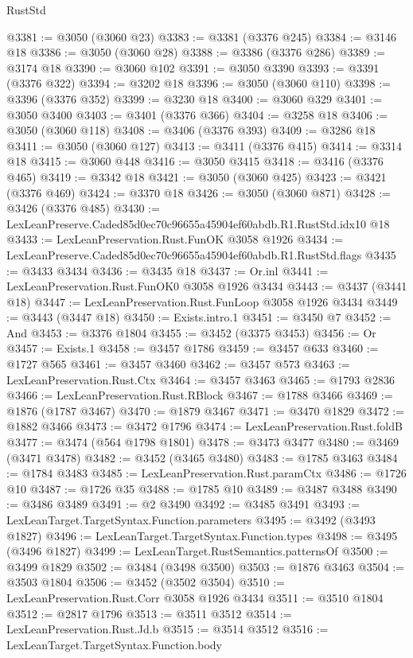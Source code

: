 \begin{lexlean}{RustStd}
\begin{coremodule}
@3381 := @3050 (@3060 @23)
@3383 := @3381 (@3376 @245)
@3384 := @3146 @18
@3386 := @3050 (@3060 @28)
@3388 := @3386 (@3376 @286)
@3389 := @3174 @18
@3390 := @3060 @102
@3391 := @3050 @3390
@3393 := @3391 (@3376 @322)
@3394 := @3202 @18
@3396 := @3050 (@3060 @110)
@3398 := @3396 (@3376 @352)
@3399 := @3230 @18
@3400 := @3060 @329
@3401 := @3050 @3400
@3403 := @3401 (@3376 @366)
@3404 := @3258 @18
@3406 := @3050 (@3060 @118)
@3408 := @3406 (@3376 @393)
@3409 := @3286 @18
@3411 := @3050 (@3060 @127)
@3413 := @3411 (@3376 @415)
@3414 := @3314 @18
@3415 := @3060 @448
@3416 := @3050 @3415
@3418 := @3416 (@3376 @465)
@3419 := @3342 @18
@3421 := @3050 (@3060 @425)
@3423 := @3421 (@3376 @469)
@3424 := @3370 @18
@3426 := @3050 (@3060 @871)
@3428 := @3426 (@3376 @485)
@3430 := LexLeanPreserve.Caded85d0ec70c96655a45904ef60abdb.R1.RustStd.idx10 @18
@3433 := LexLeanPreservation.Rust.FunOK @3058 @1926
@3434 := LexLeanPreserve.Caded85d0ec70c96655a45904ef60abdb.R1.RustStd.flags
@3435 := @3433 @3434
@3436 := @3435 @18
@3437 := Or.inl
@3441 := LexLeanPreservation.Rust.FunOK0 @3058 @1926 @3434
@3443 := @3437 (@3441 @18)
@3447 := LexLeanPreservation.Rust.FunLoop @3058 @1926 @3434
@3449 := @3443 (@3447 @18)
@3450 := Exists.intro.{1}
@3451 := @3450 @7
@3452 := And
@3453 := @3376 @1804
@3455 := @3452 (@3375 @3453)
@3456 := Or
@3457 := Exists.{1}
@3458 := @3457 @1786
@3459 := @3457 @633
@3460 := @1727 @565
@3461 := @3457 @3460
@3462 := @3457 @573
@3463 := LexLeanPreservation.Rust.Ctx
@3464 := @3457 @3463
@3465 := @1793 @2836
@3466 := LexLeanPreservation.Rust.RBlock
@3467 := @1788 @3466
@3469 := @1876 (@1787 @3467)
@3470 := @1879 @3467
@3471 := @3470 @1829
@3472 := @1882 @3466
@3473 := @3472 @1796
@3474 := LexLeanPreservation.Rust.foldB
@3477 := @3474 (@564 @1798 @1801)
@3478 := @3473 @3477
@3480 := @3469 (@3471 @3478)
@3482 := @3452 (@3465 @3480)
@3483 := @1785 @3463
@3484 := @1784 @3483
@3485 := LexLeanPreservation.Rust.paramCtx
@3486 := @1726 @10
@3487 := @1726 @35
@3488 := @1785 @10
@3489 := @3487 @3488
@3490 := @3486 @3489
@3491 := @2 @3490
@3492 := @3485 @3491
@3493 := LexLeanTarget.TargetSyntax.Function.parameters
@3495 := @3492 (@3493 @1827)
@3496 := LexLeanTarget.TargetSyntax.Function.types
@3498 := @3495 (@3496 @1827)
@3499 := LexLeanTarget.RustSemantics.patternsOf
@3500 := @3499 @1829
@3502 := @3484 (@3498 @3500)
@3503 := @1876 @3463
@3504 := @3503 @1804
@3506 := @3452 (@3502 @3504)
@3510 := LexLeanPreservation.Rust.Corr @3058 @1926 @3434
@3511 := @3510 @1804
@3512 := @2817 @1796
@3513 := @3511 @3512
@3514 := LexLeanPreservation.Rust.Jd.b
@3515 := @3514 @3512
@3516 := LexLeanTarget.TargetSyntax.Function.body

\end{coremodule}
\end{lexlean}
